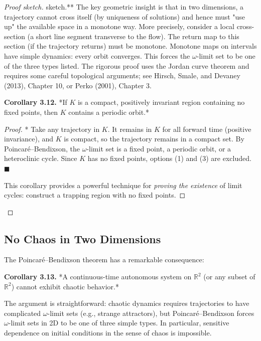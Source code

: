 \begin{proof}[Proof sketch]
sketch.** The key geometric insight is that in two dimensions, a trajectory cannot cross itself (by uniqueness of solutions) and hence must "use up" the available space in a monotone way. More precisely, consider a local cross-section (a short line segment transverse to the flow). The return map to this section (if the trajectory returns) must be monotone. Monotone maps on intervals have simple dynamics: every orbit converges. This forces the $\omega$-limit set to be one of the three types listed. The rigorous proof uses the Jordan curve theorem and requires some careful topological arguments; see Hirsch, Smale, and Devaney (2013), Chapter 10, or Perko (2001), Chapter 3.

\textbf{Corollary 3.12.} *If $K$ is a compact, positively invariant region containing no fixed points, then $K$ contains a periodic orbit.*

\begin{proof}
* Take any trajectory in $K$. It remains in $K$ for all forward time (positive invariance), and $K$ is compact, so the trajectory remains in a compact set. By Poincar\'e--Bendixson, the $\omega$-limit set is a fixed point, a periodic orbit, or a heteroclinic cycle. Since $K$ has no fixed points, options (1) and (3) are excluded. $\blacksquare$

This corollary provides a powerful technique for \textit{proving the existence} of limit cycles: construct a trapping region with no fixed points.

\end{proof}

\end{proof}

\subsection{No Chaos in Two Dimensions}\label{sec:3.6.3}

The Poincar\'e--Bendixson theorem has a remarkable consequence:

\textbf{Corollary 3.13.} *A continuous-time autonomous system on $\mathbb{R}^2$ (or any subset of $\mathbb{R}^2$) cannot exhibit chaotic behavior.*

The argument is straightforward: chaotic dynamics requires trajectories to have complicated $\omega$-limit sets (e.g., strange attractors), but Poincar\'e--Bendixson forces $\omega$-limit sets in 2D to be one of three simple types. In particular, sensitive dependence on initial conditions in the sense of chaos is impossible.

